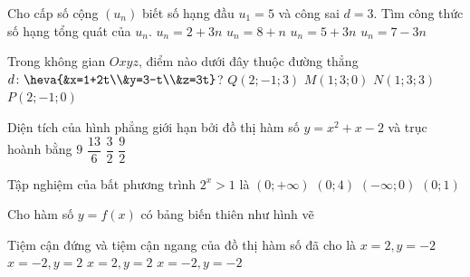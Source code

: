 \begin{ex}%
	Cho cấp số cộng $(u_n)$ biết số hạng đầu $u_1=5$ và công sai $d=3$. Tìm công thức số hạng tổng quát của $u_n$.
	\choice
	{\True $u_n=2+3n$}
	{$u_n=8+n$}
	{$u_n=5+3n$}
	{$u_n=7-3n$}
\end{ex}

\begin{ex}%
	Trong không gian $Oxyz$, điểm nào dưới đây thuộc đường thẳng $d\colon \heva{&x=1+2t\\&y=3-t\\&z=3t}$?
	\choice
	{$Q(2;-1;3)$}
	{\True $M(1;3;0)$}
	{$N(1;3;3)$}
	{$P(2;-1;0)$}
\end{ex}

\begin{ex}%
	Diện tích của hình phẳng giới hạn bởi đồ thị hàm số $y=x^2+x-2$ và trục hoành bằng
	\choice
	{$9$}
	{$\dfrac{13}{6}$}
	{$\dfrac{3}{2}$}
	{\True $\dfrac{9}{2}$}
\end{ex}

\begin{ex}%
	Tập nghiệm của bất phương trình $2^x>1$ là
	\choice
	{\True $(0;+\infty)$}
	{$(0;4)$}
	{$(-\infty;0)$}
	{$(0;1)$}
\end{ex}

\begin{ex}%
	Cho hàm số $y=f(x)$ có bảng biến thiên như hình vẽ
\begin{center}
\end{center}
	Tiệm cận đứng và tiệm cận ngang của đồ thị hàm số đã cho là
	\choice
	{\True $x=2,y=-2$}
	{$x=-2,y=2$}
	{$x=2,y=2$}
	{$x=-2,y=-2$}
\end{ex}


